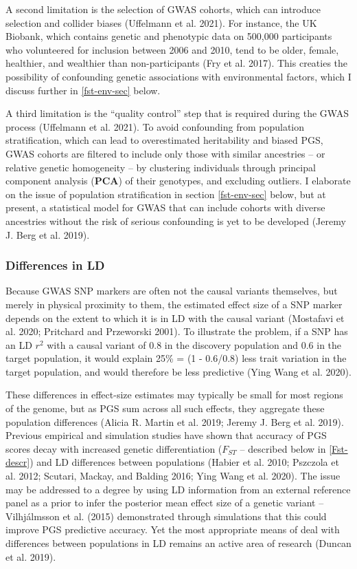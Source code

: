 \documentclass[
]{book}
\begin{document}
A second limitation is the selection of GWAS cohorts, which can introduce selection and collider biases (Uffelmann et al. 2021). For instance, the UK Biobank, which contains genetic and phenotypic data on 500,000 participants who volunteered for inclusion between 2006 and 2010, tend to be older, female, healthier, and wealthier than non-participants (Fry et al. 2017). This creaties the possibility of confounding genetic associations with environmental factors, which I discuss further in \ref{fst-env-sec} below.

A third limitation is the ``quality control'' step that is required during the GWAS process (Uffelmann et al. 2021). To avoid confounding from population stratification, which can lead to overestimated heritability and biased PGS, GWAS cohorts are filtered to include only those with similar ancestries -- or relative genetic homogeneity -- by clustering individuals through principal component analysis (\textbf{PCA}) of their genotypes, and excluding outliers. I elaborate on the issue of population stratification in section \ref{fst-env-sec} below, but at present, a statistical model for GWAS that can include cohorts with diverse ancestries without the risk of serious confounding is yet to be developed (Jeremy J. Berg et al. 2019).

\hypertarget{differences-in-ld}{%
\subsubsection{Differences in LD}\label{differences-in-ld}}

Because GWAS SNP markers are often not the causal variants themselves, but merely in physical proximity to them, the estimated effect size of a SNP marker depends on the extent to which it is in LD with the causal variant (Mostafavi et al. 2020; Pritchard and Przeworski 2001). To illustrate the problem, if a SNP has an LD \(r^2\) with a causal variant of 0.8 in the discovery population and 0.6 in the target population, it would explain 25\% = (1 - 0.6/0.8) less trait variation in the target population, and would therefore be less predictive (Ying Wang et al. 2020).

These differences in effect-size estimates may typically be small for most regions of the genome, but as PGS sum across all such effects, they aggregate these population differences (Alicia R. Martin et al. 2019; Jeremy J. Berg et al. 2019). Previous empirical and simulation studies have shown that accuracy of PGS scores decay with increased genetic differentiation (\(F_{ST}\) -- described below in \ref{Fst-descr}) and LD differences between populations (Habier et al. 2010; Pszczola et al. 2012; Scutari, Mackay, and Balding 2016; Ying Wang et al. 2020). The issue may be addressed to a degree by using LD information from an external reference panel as a prior to infer the posterior mean effect size of a genetic variant -- Vilhjálmsson et al. (2015) demonstrated through simulations that this could improve PGS predictive accuracy. Yet the most appropriate means of deal with differences between populations in LD remains an active area of research (Duncan et al. 2019).
\end{document}

